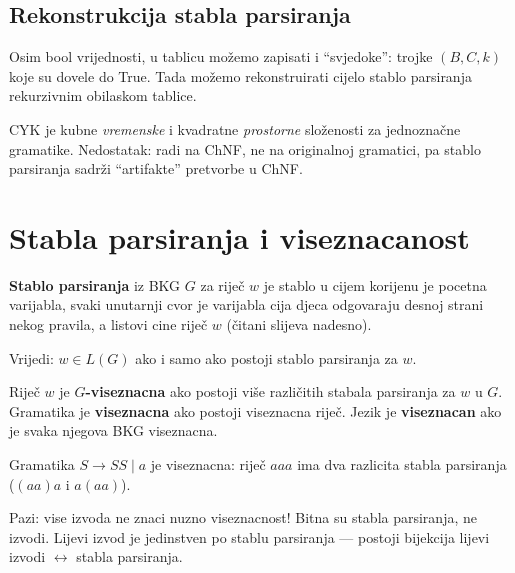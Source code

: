 \subsection{Rekonstrukcija stabla parsiranja}

Osim bool vrijednosti, u tablicu možemo zapisati i ``svjedoke'':
trojke $(B, C, k)$ koje su dovele do True. Tada možemo rekonstruirati
cijelo stablo parsiranja rekurzivnim obilaskom tablice.

\begin{kljucno}
CYK je kubne \emph{vremenske} i kvadratne \emph{prostorne} složenosti
za jednoznačne gramatike. Nedostatak: radi na ChNF, ne na originalnoj
gramatici, pa stablo parsiranja sadrži ``artifakte'' pretvorbe u ChNF.
\end{kljucno}

\section{Stabla parsiranja i viseznacanost}

\begin{definicija}
\textbf{Stablo parsiranja} iz BKG $G$ za riječ $w$ je stablo u cijem
korijenu je pocetna varijabla, svaki unutarnji cvor je varijabla
cija djeca odgovaraju desnoj strani nekog pravila, a listovi cine
riječ $w$ (čitani slijeva nadesno).
\end{definicija}

Vrijedi: $w \in L(G)$ ako i samo ako postoji stablo parsiranja za $w$.

\begin{definicija}[Viseznacanost]
Riječ $w$ je \textbf{$G$-visezna\-cna} ako postoji više različitih
stabala parsiranja za $w$ u $G$. Gramatika je \textbf{visezna\-cna}
ako postoji visezna\-cna riječ. Jezik je \textbf{visezna\-can} ako
je svaka njegova BKG visezna\-cna.
\end{definicija}

\begin{primjer}
Gramatika $S \to SS \mid a$ je visezna\-cna: riječ $aaa$ ima dva
razlicita stabla parsiranja ($(aa)a$ i $a(aa)$).

Pazi: vise izvoda ne znaci nuzno visezna\-cnost! Bitna su stabla
parsiranja, ne izvodi. Lijevi izvod je jedinstven po stablu parsiranja
--- postoji bijekcija lijevi izvodi $\leftrightarrow$ stabla parsiranja.
\end{primjer}

